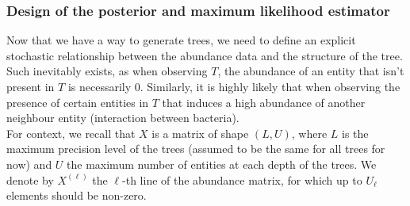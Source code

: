 \subsubsection{Design of the posterior and maximum likelihood estimator}

\newcommand{\childrennode}{\mathcal{C}}


Now that we have a way to generate trees, we need to define an explicit stochastic relationship between the abundance
data and the structure of the tree.
Such inevitably exists, as when observing $T$, the abundance of an entity that isn't present in $T$ is necessarily 0.
Similarly, it is highly likely that when observing the presence of certain entities in $T$ that induces a high abundance of
another neighbour entity (interaction between bacteria). \\

For context, we recall that $X$ is a matrix of shape $(L, U)$,
where $L$ is the maximum precision level of the trees (assumed to be the same for all trees for now) and $U$ the maximum number of entities at each depth of the trees.
We denote by $X^{(\ell)}$ the $\ell$-th line of the abundance matrix, for which up to $U_{\ell}$ elements should be non-zero. \\


